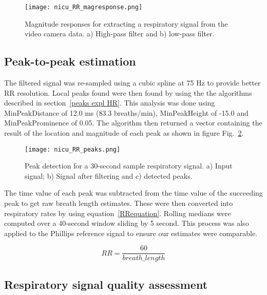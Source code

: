 \begin{center}
\begin{figure}[H]
\centering
\texttt{[image: nicu\_RR\_magresponse.png]}
    \caption[Magnitude responses for extracting a respiratory signal from the video camera data.]{Magnitude responses for extracting a respiratory signal from the video camera data. a) High-pass filter and b) low-pass filter.}
\label{filterrr}
    \end{figure}
 \end{center}

\subsection{Peak-to-peak estimation}
    \label{RR_peaks2peak}
The filtered signal was re-sampled using a cubic spline at 75 Hz to provide better RR resolution. Local peaks found were then found by using the the algorithms described in section~\ref{peaks expl HR}. This analysis was done using MinPeakDistance of 12.0 ms (83.3 breaths/min), MinPeakHeight of -15.0 and MinPeakProminence of 0.05. The algorithm then returned a vector containing the result of the location and magnitude of each peak as shown in figure Fig.~\ref{RR_peaks}.

\begin{center}
\begin{figure}[H]
\centering
\texttt{[image: nicu\_RR\_peaks.png]}
    \caption[Peak detection for a 30-second sample respiratory signal.] {Peak detection for a 30-second sample respiratory signal. a) Input signal; b) Signal after filtering and c) detected peaks.}
    \label{RR_peaks}
    \end{figure}
 \end{center}
 
 The time value of each peak was subtracted from the time value of the succeeding peak to get raw breath length estimates. These were then converted into respiratory rates by using equation~\ref{RRequation}. Rolling medians were computed over a 40-second window sliding by 5 second. This process was also applied to the Phillips reference signal to ensure our estimates were comparable.
 
 \begin{equation}
 RR = \frac{60}{breath\_length}
\label{RRequation}
\end{equation}

\subsection{Respiratory signal quality assessment}
\label{rrsqi}
